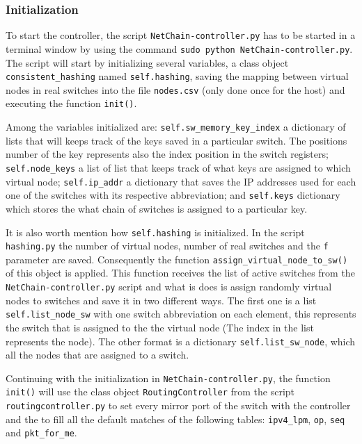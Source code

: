 \documentclass[11pt,oneside,a4paper]{article}
\begin{document}
\subsubsection{Initialization}

To start the controller, the script {\color{violet}\texttt{NetChain-controller.py}} has to be started in a terminal window by using the command {\color{brown}\texttt{sudo python NetChain-controller.py}}. The script will start by initializing several variables, a class object {\color{violet}\texttt{consistent\_hashing}} named {\color{violet}\texttt{self.hashing}}, saving the mapping between virtual nodes in real switches into the file {\color{brown}\texttt{nodes.csv}} (only done once for the host) and executing the function {\color{violet}\texttt{init()}}.

Among the variables initialized are: {\color{violet}\texttt{self.sw\_memory\_key\_index}} a dictionary of lists that will keeps track of the keys saved in a particular switch. The positions number of the key represents also the index position in the switch registers; {\color{violet}\texttt{self.node\_keys}} a list of list that keeps track of what keys are assigned to which virtual node; {\color{violet}\texttt{self.ip\_addr}} a dictionary that saves the IP addresses used for each one of the switches with its respective abbreviation; and {\color{violet}\texttt{self.keys}} dictionary which stores the what chain of switches is assigned to a particular key. 

It is also worth mention how {\color{violet}\texttt{self.hashing}} is initialized. In the script {\color{violet}\texttt{hashing.py}} the number of virtual nodes, number of real switches and the {\color{brown}\texttt{f}} parameter are saved. Consequently the function {\color{violet}\texttt{assign\_virtual\_node\_to\_sw()}} of this object is applied. This function receives the list of active switches from the {\color{violet}\texttt{NetChain-controller.py}} script and what is does is assign randomly virtual nodes to switches and save it in two different ways. The first one is a list {\color{violet}\texttt{self.list\_node\_sw}} with one switch abbreviation on each element, this represents the switch that is assigned to the the virtual node (The index in the list represents the node). The other format is a dictionary {\color{violet}\texttt{self.list\_sw\_node}}, which all the nodes that are assigned to a switch.

Continuing with the initialization in {\color{violet}\texttt{NetChain-controller.py}}, the function {\color{violet}\texttt{init()}}  will use the class object {\color{violet}\texttt{RoutingController}} from the script {\color{violet}\texttt{routingcontroller.py}} to set every mirror port of the switch with the controller and the to fill all the default matches of the following tables: {\color{red}\texttt{ipv4\_lpm}}, {\color{red}\texttt{op}}, {\color{red}\texttt{seq}} and {\color{red}\texttt{pkt\_for\_me}}. 
\end{document}

